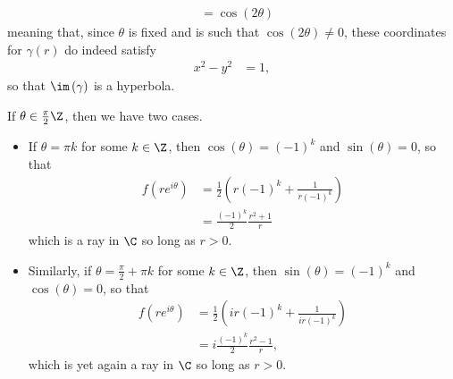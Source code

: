 \documentclass[10pt]{mypackage}
\begin{document}
\begin{solution}
\begin{enumerate}[(a)]
\begin{align*}
                                                                                                                                            &= \cos\left( 2\theta \right)
      \end{align*}
      meaning that, since $\theta$ is fixed and is such that $\cos\left( 2\theta \right)\neq 0$, these coordinates for $\gamma\left( r \right)$ do indeed satisfy
      \begin{align*}
        x^2 - y^2 &= 1,
      \end{align*}
      so that $\im\left( \gamma \right)$ is a hyperbola.\newline

      If $\theta\in \frac{\pi}{2}\Z$, then we have two cases.
      \begin{itemize}
        \item If $\theta = \pi k$ for some $k\in \Z$, then $\cos\left( \theta \right) = \left( -1 \right)^{k}$ and $\sin\left( \theta \right) = 0$, so that
          \begin{align*}
            f\left( re^{i\theta} \right) &= \frac{1}{2}\left( r\left( -1 \right)^{k} + \frac{1}{r\left( -1 \right)^{k}} \right)\\
                                         &= \frac{\left( -1 \right)^{k}}{2} \frac{r^2 + 1}{r}
          \end{align*}
          which is a ray in $\C$ so long as $ r > 0 $.
        \item Similarly, if $\theta = \frac{\pi}{2} + \pi k$ for some $k\in \Z$, then $\sin\left( \theta \right) = \left( -1 \right)^{k}$ and $\cos\left( \theta \right) = 0$, so that
          \begin{align*}
            f\left( re^{i\theta} \right) &= \frac{1}{2}\left( ir\left( -1 \right)^{k} + \frac{1}{ir\left( -1 \right)^{k}} \right)\\
                                         &= i\frac{\left( -1 \right)^{k}}{2} \frac{r^2 - 1}{r},
          \end{align*}
          which is yet again a ray in $\C$ so long as $r > 0$.
      \end{itemize}
  \end{enumerate}
\end{solution}
\end{document}
